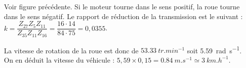 \begin{corrigebox}
Voir figure précédente. Si le moteur tourne dans le sens positif, la roue tourne dans le sens négatif.
Le rapport de réduction de la transmission est le suivant : 
$k=\dfrac{Z_{27} Z_{5} Z_{11} }{Z_{35} Z_{11} Z_{16}} = \dfrac{16\cdot 14}{84\cdot 75} =0,0355 $.

La vitesse de rotation de la roue est donc de $\SI{53,33}{tr.min^{-1}}$ soit \SI{5,59}{rad.s^{-1}}. 
On en déduit la vitesse du véhicule : $5,59 \times 0,15 = \SI{0,84}{m.s^{-1}}\simeq \SI{3}{km.h^{-1}}$.
\end{corrigebox}
